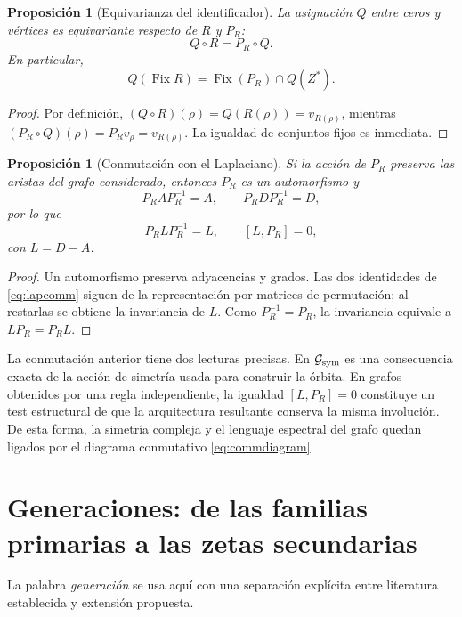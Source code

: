 \documentclass[11pt]{amsart}
\newtheorem{proposition}[theorem]{Proposición}
\theoremstyle{definition}
\theoremstyle{remark}
\begin{document}
\begin{proposition}[Equivarianza del identificador]\label{prop:equivariance}
La asignación $Q$ entre ceros y vértices es equivariante respecto de $R$ y $P_R$:
\begin{equation}\label{eq:commdiagram}
Q\circ R=P_R\circ Q.
\end{equation}
En particular,
\[
Q(\operatorname{Fix}R)=\operatorname{Fix}(P_R)\cap Q(Z^*).
\]
\end{proposition}

\begin{proof}
Por definición, $(Q\circ R)(\rho)=Q(R(\rho))=v_{R(\rho)}$, mientras $(P_R\circ Q)(\rho)=P_Rv_{\rho}=v_{R(\rho)}$. La igualdad de conjuntos fijos es inmediata.
\end{proof}

\begin{proposition}[Conmutación con el Laplaciano]\label{prop:lapcomm}
Si la acción de $P_R$ preserva las aristas del grafo considerado, entonces $P_R$ es un automorfismo y
\begin{equation}\label{eq:lapcomm}
P_RAP_R^{-1}=A,\qquad P_RDP_R^{-1}=D,
\end{equation}
por lo que
\begin{equation}
P_RLP_R^{-1}=L,\qquad [L,P_R]=0,
\end{equation}
con $L=D-A$.
\end{proposition}

\begin{proof}
Un automorfismo preserva adyacencias y grados. Las dos identidades de \eqref{eq:lapcomm} siguen de la representación por matrices de permutación; al restarlas se obtiene la invariancia de $L$. Como $P_R^{-1}=P_R$, la invariancia equivale a $LP_R=P_RL$.
\end{proof}

La conmutación anterior tiene dos lecturas precisas. En $\mathcal G_{\rm sym}$ es una consecuencia exacta de la acción de simetría usada para construir la órbita. En grafos obtenidos por una regla independiente, la igualdad $[L,P_R]=0$ constituye un test estructural de que la arquitectura resultante conserva la misma involución. De esta forma, la simetría compleja y el lenguaje espectral del grafo quedan ligados por el diagrama conmutativo \eqref{eq:commdiagram}.

\section{Generaciones: de las familias primarias a las zetas secundarias}
La palabra \emph{generación} se usa aquí con una separación explícita entre literatura establecida y extensión propuesta.
\end{document}
